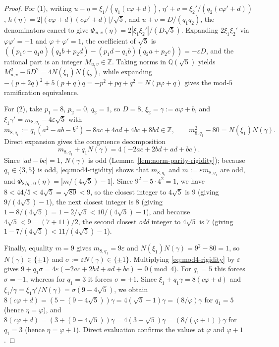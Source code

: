 \documentclass[11pt]{amsart}
\theoremstyle{definition}
\theoremstyle{remark}
\numberwithin{equation}{section}
\newcommand{\Q}{\mathbb{Q}}
\newcommand{\Z}{\mathbb{Z}}
\begin{document}
\begin{proof}
For (1), writing $u-\eta=\xi_1/(q_1(c\varphi+d))$,
$\eta'+v=\xi_2'/(q_2(c\varphi'+d))$,
$h(\eta)=2|(c\varphi+d)(c\varphi'+d)|/\sqrt5$, and
$u+v=D/(q_1q_2)$, the denominators cancel to give
$\Phi_{u,v}(\eta)=2|\xi_1\xi_2'|/(D\sqrt5)$. Expanding $2\xi_1\xi_2'$ via
$\varphi\varphi'=-1$ and $\varphi+\varphi'=1$, the coefficient of
$\sqrt5$ is
$((p_1c-q_1a)(q_2b+p_2d)-(p_1d-q_1b)(q_2a+p_2c))=-\varepsilon D$, and
the rational part is an integer $M_{u,v}\in\Z$. Taking norms in
$\Q(\sqrt5)$ yields $M_{u,v}^2-5D^2=4N(\xi_1)N(\xi_2)$, while expanding
$-(p+2q)^2+5(p+q)q=-p^2+pq+q^2=N(p\varphi+q)$ gives the mod-$5$
ramification equivalence.

For (2), take $p_1=8$, $p_2=0$, $q_2=1$, so $D=8$, $\xi_2=\gamma:=a\varphi+b$,
and $\xi_1\gamma'=m_{8,q_1}-4\varepsilon\sqrt5$ with
\[
 m_{8,q_1}:=q_1(a^2-ab-b^2)-8ac+4ad+4bc+8bd\in\Z,
 \qquad m_{8,q_1}^2-80=N(\xi_1)N(\gamma).
\]
Direct expansion gives the congruence decomposition
\begin{equation}\label{eq:mod4-rigidity}
 m_{8,q_1}+q_1N(\gamma)=4(-2ac+2bd+ad+bc).
\end{equation}
Since $|ad-bc|=1$, $N(\gamma)$ is odd (Lemma~\ref{lem:norm-parity-rigidity});
because $q_1\in\{3,5\}$ is odd, \eqref{eq:mod4-rigidity} shows that
$m_{8,q_1}$ and $m:=\varepsilon m_{8,q_1}$ are odd, and
$\Phi_{8/q_1,0}(\eta)=|m/(4\sqrt5)-1|$. Since $9^2-5\cdot4^2=1$, we have
$8<44/5<4\sqrt5=\sqrt{80}<9$, so the closest integer to $4\sqrt5$ is $9$
(giving $9/(4\sqrt5)-1$), the next closest integer is $8$ (giving
$1-8/(4\sqrt5)=1-2/\sqrt5<10/(4\sqrt5)-1$), and because $4\sqrt5<9=(7+11)/2$,
the second closest \emph{odd} integer to $4\sqrt5$ is $7$ (giving
$1-7/(4\sqrt5)<11/(4\sqrt5)-1$).

Finally, equality $m=9$ gives $m_{8,q_1}=9\varepsilon$ and
$N(\xi_1)N(\gamma)=9^2-80=1$, so $N(\gamma)\in\{\pm1\}$ and
$\sigma:=\varepsilon N(\gamma)\in\{\pm1\}$. Multiplying
\eqref{eq:mod4-rigidity} by $\varepsilon$ gives
$9+q_1\sigma=4\varepsilon(-2ac+2bd+ad+bc)\equiv0\pmod4$. For $q_1=5$
this forces $\sigma=-1$, whereas for $q_1=3$ it forces $\sigma=+1$. Since
$\xi_1+q_1\gamma=8(c\varphi+d)$ and
$\xi_1/\gamma=\xi_1\gamma'/N(\gamma)=\sigma(9-4\sqrt5)$, we obtain
$8(c\varphi+d)=(5-(9-4\sqrt5))\gamma=4(\sqrt5-1)\gamma=(8/\varphi)\gamma$
for $q_1=5$ (hence $\eta=\varphi$), and
$8(c\varphi+d)=(3+(9-4\sqrt5))\gamma=4(3-\sqrt5)\gamma=(8/(\varphi+1))\gamma$
for $q_1=3$ (hence $\eta=\varphi+1$). Direct evaluation confirms the
values at $\varphi$ and $\varphi+1$.
\end{proof}
\end{document}
